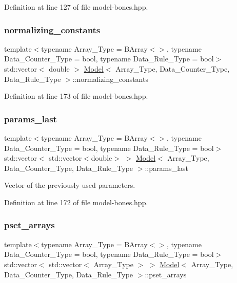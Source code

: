 Definition at line 127 of file model-\/bones.\+hpp.

\mbox{\label{class_model_aa4479d146005e89350dad6ba7bd8121a}} 
\subsubsection{\texorpdfstring{normalizing\+\_\+constants}{normalizing\_constants}}
{\footnotesize\ttfamily template$<$typename Array\+\_\+\+Type = B\+Array$<$$>$, typename Data\+\_\+\+Counter\+\_\+\+Type = bool, typename Data\+\_\+\+Rule\+\_\+\+Type = bool$>$ \\
std\+::vector$<$ double $>$ \hyperlink{class_model}{Model}$<$ Array\+\_\+\+Type, Data\+\_\+\+Counter\+\_\+\+Type, Data\+\_\+\+Rule\+\_\+\+Type $>$\+::normalizing\+\_\+constants}



Definition at line 173 of file model-\/bones.\+hpp.

\mbox{\label{class_model_add8183af946f2871480b6a6f9f1c8013}} 
\subsubsection{\texorpdfstring{params\+\_\+last}{params\_last}}
{\footnotesize\ttfamily template$<$typename Array\+\_\+\+Type = B\+Array$<$$>$, typename Data\+\_\+\+Counter\+\_\+\+Type = bool, typename Data\+\_\+\+Rule\+\_\+\+Type = bool$>$ \\
std\+::vector$<$ std\+::vector$<$double$>$ $>$ \hyperlink{class_model}{Model}$<$ Array\+\_\+\+Type, Data\+\_\+\+Counter\+\_\+\+Type, Data\+\_\+\+Rule\+\_\+\+Type $>$\+::params\+\_\+last}



Vector of the previously used parameters. 



Definition at line 172 of file model-\/bones.\+hpp.

\mbox{\label{class_model_a875ac0dbc320797c843b6724b7736f77}} 
\subsubsection{\texorpdfstring{pset\+\_\+arrays}{pset\_arrays}}
{\footnotesize\ttfamily template$<$typename Array\+\_\+\+Type = B\+Array$<$$>$, typename Data\+\_\+\+Counter\+\_\+\+Type = bool, typename Data\+\_\+\+Rule\+\_\+\+Type = bool$>$ \\
std\+::vector$<$ std\+::vector$<$ Array\+\_\+\+Type $>$ $>$ \hyperlink{class_model}{Model}$<$ Array\+\_\+\+Type, Data\+\_\+\+Counter\+\_\+\+Type, Data\+\_\+\+Rule\+\_\+\+Type $>$\+::pset\+\_\+arrays}



